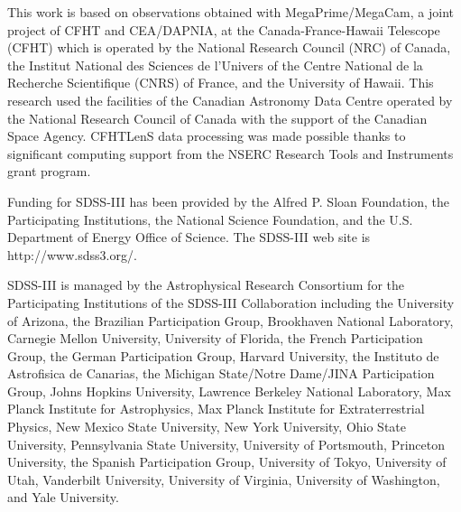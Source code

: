 \documentclass[fleqn,usenatbib]{mnras}
\begin{document}
This work is based on observations obtained with MegaPrime/MegaCam, a
joint project of CFHT and CEA/DAPNIA, at the Canada-France-Hawaii
Telescope (CFHT) which is operated by the National Research Council
(NRC) of Canada, the Institut National des Sciences de l'Univers of
the Centre National de la Recherche Scientifique (CNRS) of France, and
the University of Hawaii. This research used the facilities of the
Canadian Astronomy Data Centre operated by the National Research
Council of Canada with the support of the Canadian Space Agency.
CFHTLenS data processing was made possible thanks to significant
computing support from the NSERC Research Tools and Instruments grant
program.

Funding for SDSS-III has been provided by the Alfred P. Sloan Foundation, the
Participating Institutions, the National Science Foundation, and the U.S.
Department of Energy Office of Science. The SDSS-III web site is
http://www.sdss3.org/.

SDSS-III is managed by the Astrophysical Research Consortium for the
Participating Institutions of the SDSS-III Collaboration including the
University of Arizona, the Brazilian Participation Group, Brookhaven National
Laboratory, Carnegie Mellon University, University of Florida, the French
Participation Group, the German Participation Group, Harvard University, the
Instituto de Astrofisica de Canarias, the Michigan State/Notre Dame/JINA
Participation Group, Johns Hopkins University, Lawrence Berkeley National
Laboratory, Max Planck Institute for Astrophysics, Max Planck Institute for
Extraterrestrial Physics, New Mexico State University, New York University,
Ohio State University, Pennsylvania State University, University of Portsmouth,
Princeton University, the Spanish Participation Group, University of Tokyo,
University of Utah, Vanderbilt University, University of Virginia, University
of Washington, and Yale University.

\footnotesize{


}

\bsp	%
\label{lastpage}
\end{document}
